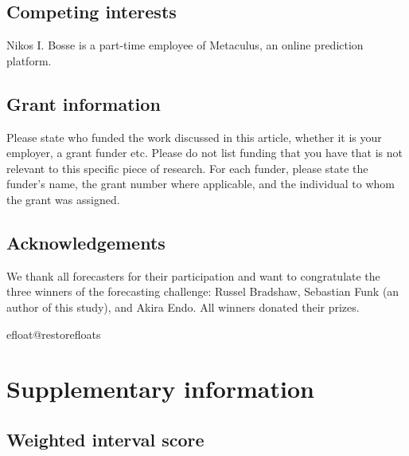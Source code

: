 \documentclass[10pt,a4paper,twocolumn]{article}
\begin{document}
\subsection*{Competing interests}
Nikos I. Bosse is a part-time employee of Metaculus, an online prediction platform. 

\subsection*{Grant information}
Please state who funded the work discussed in this article, whether it is your employer,
a grant funder etc. Please do not list funding that you have that is not relevant to this
specific piece of research. For each funder, please state the funder’s name, the grant
number where applicable, and the individual to whom the grant was assigned.

\subsection*{Acknowledgements}
We thank all forecasters for their participation and want to congratulate the three winners of the forecasting challenge: Russel Bradshaw, Sebastian Funk (an author of this study), and Akira Endo. All winners donated their prizes. 



\clearpage

{\small
}

\bigskip
\clearpage


\processdelayedfloats
\csname efloat@restorefloats\endcsname

\appendix
\section*{Supplementary information}
\renewcommand{\thefigure}{SI.\arabic{figure}}
\setcounter{figure}{0}
\renewcommand{\thetable}{SI.\arabic{table}} \setcounter{table}{0}


\subsection*{Weighted interval score}
\label{sec:wis}
\end{document}

